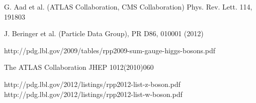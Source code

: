 \documentclass[a4paper,10pt]{article}
\begin{document}
\begin{thebibliography}{99}

    G. Aad et al. (ATLAS Collaboration, CMS Collaboration) Phys. Rev. Lett. 114, 191803

   J. Beringer et al. (Particle Data Group), PR D86, 010001 (2012)

   http://pdg.lbl.gov/2009/tables/rpp2009-sum-gauge-higgs-bosons.pdf

   The ATLAS Collaboration JHEP 1012(2010)060

   http://pdg.lbl.gov/2012/listings/rpp2012-list-z-boson.pdf
	http://pdg.lbl.gov/2012/listings/rpp2012-list-w-boson.pdf
\end{thebibliography}
\end{document}
